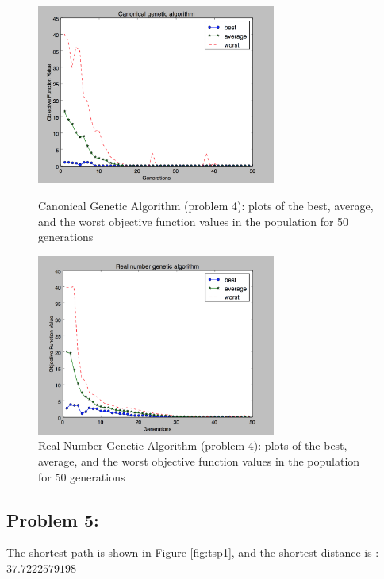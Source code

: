 \documentclass{article}
\begin{document}
\begin{figure}[h]
\includegraphics[width=0.7\textwidth]{Canonical_GA_best_plot}
\centering
\caption{Canonical Genetic Algorithm (problem 4): plots of the best, average, and the worst objective function values in the population for 50 generations}


\includegraphics[width=0.7\textwidth]{Real_number_GA}
\centering
\caption{Real Number Genetic Algorithm (problem 4): plots of the best, average, and the worst objective function values in the population for 50 generations}
\end{figure}


\subsection*{{Problem 5: }}

The shortest path is shown in Figure \ref{fig:tsp1}, and the shortest distance is : $37.7222579198$
\end{document}
